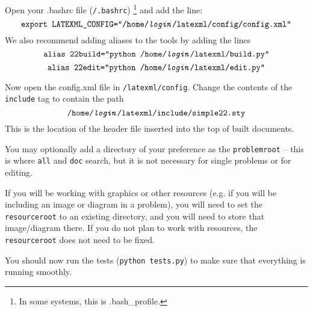    Open your .bashrc file (\texttt{\mytilde/.bashrc})
    \footnote{In some systems, this is .bash\_profile.} 
    and add the line: 
    \[\texttt{export LATEXML\_CONFIG=\ttquote /home/\textit{login}/latexml/config/config.xml\ttquote}\]
    We also recommend adding aliases to the 
    tools by adding the lines 
    \[\texttt{alias 22build=\ttquote python /home/\textit{login}/latexml/build.py\ttquote}\]
    \[\texttt{alias 22edit=\ttquote python /home/\textit{login}/latexml/edit.py\ttquote}\]
    
    Now open the config.xml file in \texttt{\mytilde/latexml/config}. 
    Change the contents of the \texttt{include} tag to contain the path 
    \[\texttt{/home/\textit{login}/latexml/include/simple22.sty}\] 
    This is the location of 
    the header file inserted into the top of built documents. 
    
    You may optionally
    add a directory of your preference as the \texttt{problemroot} -- this
    is where \texttt{\pybuild all} and \texttt{\pybuild doc} search, but
    it is not necessary for single problems or for editing.
    
    If you will be working with graphics or other resources (e.g. if you
    will be including an image or diagram in a problem), you will need to
    set the \texttt{resourceroot} to an existing directory, and you will
    need to store that image/diagram there. If you do not plan to work
    with resources, the \texttt{resourceroot} does not need to be fixed.
    
    You should now run the tests (\texttt{python tests.py}) to make sure that 
    everything is running smoothly.
    
